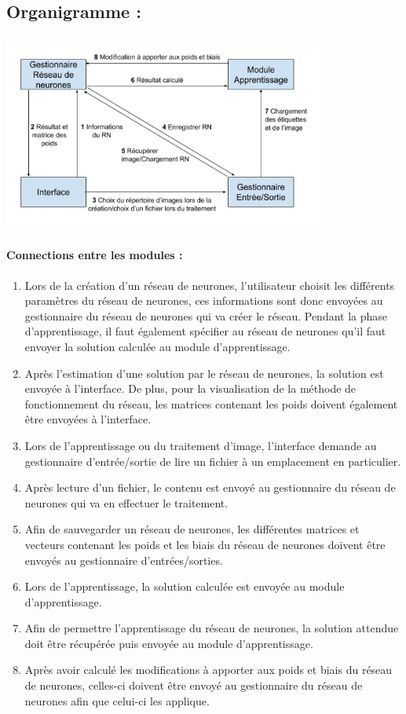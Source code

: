 \documentclass{article}
\begin{document}
\subsection{Organigramme :}
			\begin{center} 
				\includegraphics[height=244, width=400]{organigramme.png}
			\end{center}
	\paragraph{Connections entre les modules :}
			\begin{enumerate}
				\item Lors de la création d'un réseau de neurones, l'utilisateur choisit les différents paramètres du réseau de neurones, ces informations sont donc envoyées au gestionnaire du réseau de neurones qui va créer le réseau. Pendant la phase d'apprentissage, il faut également spécifier au réseau de neurones qu'il faut envoyer la solution calculée au module d'apprentissage.
				\item Après l'estimation d'une solution par le réseau de neurones, la solution est envoyée à l'interface. De plus, pour la visualisation de la méthode de fonctionnement du réseau, les matrices contenant les poids doivent également être envoyées à l'interface.
				\item Lors de l'apprentissage ou du traitement d'image, l'interface demande au gestionnaire d'entrée/sortie de lire un fichier à un emplacement en particulier.
				\item Après lecture d'un fichier, le contenu est envoyé au gestionnaire du réseau de neurones qui va en effectuer le traitement.
				\item Afin de sauvegarder un réseau de neurones, les différentes matrices et vecteurs contenant les poids et les biais du réseau de neurones doivent être envoyés au gestionnaire d'entrées/sorties.
				\item Lors de l'apprentissage, la solution calculée est envoyée au module d'apprentissage.
				\item Afin de permettre l'apprentissage du réseau de neurones, la solution attendue doit être récupérée puis envoyée au module d'apprentissage.
				\item Après avoir calculé les modifications à apporter aux poids et biais du réseau de neurones, celles-ci doivent être envoyé au gestionnaire du réseau de neurones afin que celui-ci les applique.
			\end{enumerate}
\end{document}
